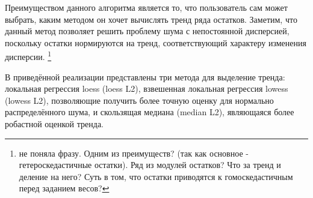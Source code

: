 \documentclass[specialist,
               substylefile = spbu.rtx,
               subf,href,colorlinks=true, 12pt]{disser}
\begin{document}

Преимуществом данного алгоритма является то, что пользователь сам может выбрать, каким методом он хочет вычислять тренд ряда остатков. Заметим, что данный метод позволяет решить проблему шума с непостоянной дисперсией, поскольку остатки нормируются на тренд, соответствующий характеру изменения дисперсии.
\footnote{не поняла фразу. Одним из преимуществ? (так как основное - гетероскедастичные остатки). Ряд из модулей остатков? Что за тренд и деление на него? Суть в том, что остатки приводятся к гомоскедастичным перед заданием весов?}
	
В приведённой реализации представлены три метода для выделение тренда: локальная регрессия loess (loess L2), взвешенная локальная регрессия lowess (lowess L2), позволяющие получить более точную оценку для нормально распределённого шума, и скользящая медиана (median L2), являющаяся более робастной оценкой тренда.
\end{document}
